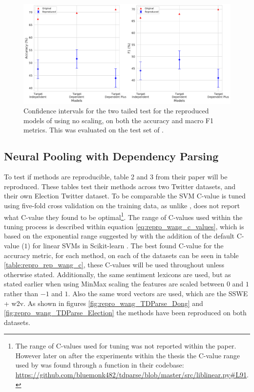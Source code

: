 \begin{figure}[!h]
    \centering
    \includegraphics[scale=0.37]{images/reproducibility/vo/Target_Non_Scaled_Reproduction_Dong.pdf}
    \caption{Confidence intervals for the two tailed test for the reproduced models of \citet{vo2015target} using no scaling, on both the accuracy and macro F1 metrics. This was evaluated on the test set of \citet{dong-etal-2014-adaptive}.}
    \label{fig:repro_vo_Target_Non_Scaled_Reproduction_Dong}
\end{figure}

\FloatBarrier
\subsection{Neural Pooling with Dependency Parsing}

To test if \citet{wang-etal-2017-tdparse} methods are reproducible, table 2 and 3 from their paper will be reproduced. These tables test their methods across two Twitter datasets, \citet{dong-etal-2014-adaptive} and their own Election Twitter dataset. To be comparable the SVM C-value is tuned using five-fold cross validation on the training data, as unlike \citet{vo2015target}, \citet{wang-etal-2017-tdparse} does not report what C-value they found to be optimal\footnote{The range of C-values \citet{wang-etal-2017-tdparse} used for tuning was not reported within the paper. However later on after the experiments within the thesis the C-value range used by \citet{wang-etal-2017-tdparse} was found through a function in their codebase: \url{https://github.com/bluemonk482/tdparse/blob/master/src/liblinear.py\#L91}.}. The range of C-values used within the tuning process is described within equation \ref{eq:repro_wang_c_values}, which is based on the exponential range suggested by \citet{hsu2003practical} with the addition of the default C-value ($1$) for linear SVMs in Scikit-learn \citep{pedregosa2011scikit}. The best found C-value for the accuracy metric, for each method, on each of the datasets can be seen in table \ref{table:repro_rep_wang_c}, these C-values will be used throughout unless otherwise stated. Additionally, the same sentiment lexicons are used, but as stated earlier when using MinMax scaling the features are scaled between $0$ and $1$ rather than $-1$ and $1$. Also the same word vectors are used, which are the SSWE + w2v. As shown in figures \ref{fig:repro_wang_TDParse_Dong} and \ref{fig:repro_wang_TDParse_Election} the methods have been reproduced on both datasets.

